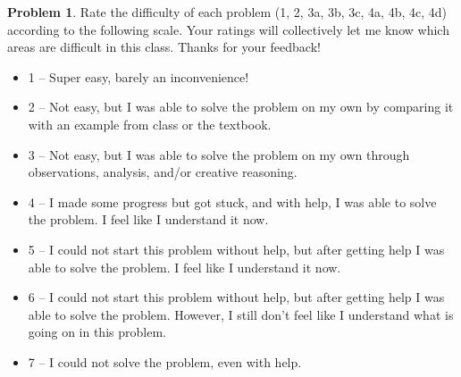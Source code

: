 \documentclass[11pt,oneside]{amsart}
\theoremstyle{definition}
\newtheorem{problem}{Problem}
\theoremstyle{plain}
\begin{document}
\begin{problem}
Rate the difficulty of each problem (1, 2, 3a, 3b, 3c, 4a, 4b, 4c, 4d) according to the following scale. Your ratings will collectively let me know which areas are difficult in this class. Thanks for your feedback!
\begin{itemize}
  \item 1 -- Super easy, barely an inconvenience!
  \item 2 -- Not easy, but I was able to solve the problem on my own by comparing it with an example from class or the textbook.
  \item 3 -- Not easy, but I was able to solve the problem on my own through observations, analysis, and/or creative reasoning.
  \item 4 -- I made some progress but got stuck, and with help, I was able to solve the problem. I feel like I understand it now.
  \item 5 -- I could not start this problem without help, but after getting help I was able to solve the problem. I feel like I understand it now.
  \item 6 -- I could not start this problem without help, but after getting help I was able to solve the problem. However, I still don't feel like I understand what is going on in this problem.
  \item 7 -- I could not solve the problem, even with help.
\end{itemize}
\end{problem}
\end{document}
